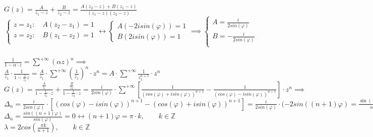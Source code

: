 \documentclass[12pt]{article}
\begin{document}
{{$G(z) = \frac{A}{z_1-z}+\frac{B}{z_2-z}=\frac{A(z_2-z)+B(z_1-z)}{(z_1-z)(z_2-z)}$\\
\begin{equation*}
	\begin{cases*}
		z=z_1: \quad A(z_2-z_1)=1\\
		z=z_2: \quad B(z_1-z_2)=1\\
	\end{cases*}
	\leftrightarrow
	\begin{cases*}
		A(-2isin(\varphi))=1\\
		B(2isin(\varphi))=1
	\end{cases*} \implies
	\begin{cases*}
		A=\frac{i}{2sin(\varphi)}\\
		B = -\frac{i}{2sin(\varphi)}\\
	\end{cases*}
\end{equation*}\\
$\frac{1}{1-\alpha \cdot z} = \sum^{+\infty} (\alpha z)^n \implies$\\
$\frac{A}{z_1}\cdot \frac{1}{1-\frac{1}{z_1}z} = \frac{A}{z_1} \cdot \sum^{+\infty} (\frac{1}{z_1})^n 
\cdot z^n =A \cdot \sum^{+\infty} \frac{1}{z_1^{n+1}} \cdot z^n$\\
$G(z) = \frac{\frac{A}{z_1}}{1-\frac{1}{z_1}\cdot z} + \frac{\frac{B}{z_2}}{1-\frac{1}{z_2}\cdot z}= \frac{i}{2sin(\varphi)}\cdot \sum^{+\infty}[\frac{1}{(cos(\varphi)+isin(\varphi))^{n+1}} - \frac{1}{(cos(\varphi)-isin(\varphi))^{n+1}}]\cdot z^n \implies$
$\Delta_n = \frac{i}{2sin(\varphi)}\cdot[(cos(\varphi)-isin(\varphi))^{n+1} - (cos(\varphi)+isin(\varphi))^{n+1}] = \frac{i}{2sin(\varphi)}\cdot(-2sin((n+1)\varphi) = \frac{\sin((n+1)\varphi)}{sin(\varphi)}$\\
$\Delta_n=\frac{sin((n+1)\varphi)}{sin(\varphi)} = 0 \leftrightarrow (n+1)\varphi = \pi \cdot k, \qquad k \in \mathbb{Z}$\\
$\lambda = 2cos(\frac{\pi k}{n+1}), \qquad k \in \mathbb{Z}$

}
\newpage}
\end{document}
